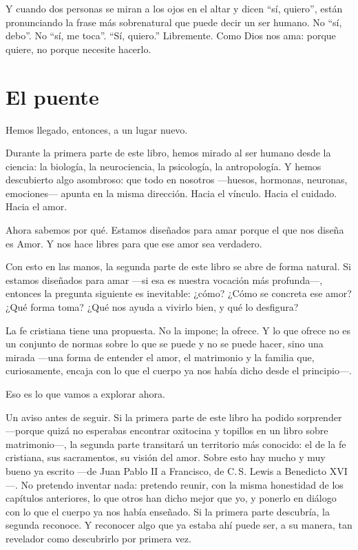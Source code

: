 Y cuando dos personas se miran a los ojos en el altar y dicen ``sí, quiero'', están pronunciando la frase más sobrenatural que puede decir un ser humano. No ``sí, debo''. No ``sí, me toca''. ``Sí, quiero.'' Libremente. Como Dios nos ama: porque quiere, no porque necesite hacerlo.

\section{El puente}

Hemos llegado, entonces, a un lugar nuevo.

Durante la primera parte de este libro, hemos mirado al ser humano desde la ciencia: la biología, la neurociencia, la psicología, la antropología. Y hemos descubierto algo asombroso: que todo en nosotros ---huesos, hormonas, neuronas, emociones--- apunta en la misma dirección. Hacia el vínculo. Hacia el cuidado. Hacia el amor.

Ahora sabemos por qué. Estamos diseñados para amar porque el que nos diseña es Amor. Y nos hace libres para que ese amor sea verdadero.

Con esto en las manos, la segunda parte de este libro se abre de forma natural. Si estamos diseñados para amar ---si esa es nuestra vocación más profunda---, entonces la pregunta siguiente es inevitable: ¿cómo? ¿Cómo se concreta ese amor? ¿Qué forma toma? ¿Qué nos ayuda a vivirlo bien, y qué lo desfigura?

La fe cristiana tiene una propuesta. No la impone; la ofrece. Y lo que ofrece no es un conjunto de normas sobre lo que se puede y no se puede hacer, sino una mirada ---una forma de entender el amor, el matrimonio y la familia que, curiosamente, encaja con lo que el cuerpo ya nos había dicho desde el principio---.

Eso es lo que vamos a explorar ahora.

Un aviso antes de seguir. Si la primera parte de este libro ha podido sorprender ---porque quizá no esperabas encontrar oxitocina y topillos en un libro sobre matrimonio---, la segunda parte transitará un territorio más conocido: el de la fe cristiana, sus sacramentos, su visión del amor. Sobre esto hay mucho y muy bueno ya escrito ---de Juan Pablo II a Francisco, de C.\,S. Lewis a Benedicto XVI---. No pretendo inventar nada: pretendo reunir, con la misma honestidad de los capítulos anteriores, lo que otros han dicho mejor que yo, y ponerlo en diálogo con lo que el cuerpo ya nos había enseñado. Si la primera parte descubría, la segunda reconoce. Y reconocer algo que ya estaba ahí puede ser, a su manera, tan revelador como descubrirlo por primera vez.

